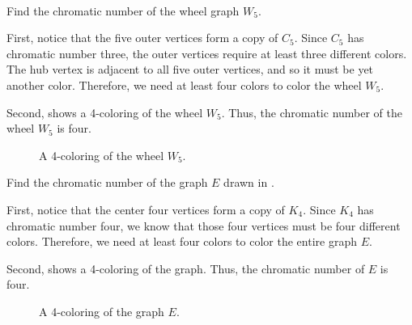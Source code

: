 \begin{exam}
\label{exam_chromatic_complicated}
~
    \begin{apart}
                
        \item Find the chromatic number of the wheel graph $W_5$. 
            \begin{soln}
                First, notice that the five outer vertices form a copy of $C_5$.  Since $C_5$ has chromatic number three, the outer vertices require at least three different colors. The hub vertex is adjacent to all five outer vertices, and so it must be yet another color.  Therefore, we need at least four colors to color the wheel $W_5$. 
                    
                Second,  shows a 4-coloring of the wheel $W_5$. Thus, the chromatic number of the wheel $W_5$ is four.
            \end{soln}

                \begin{figure}[hbtp]
                    \centering
                    
                    \caption{A 4-coloring of the wheel $W_5$.}
                    \label{fig_wheel5_4colored}
                \end{figure}
        \item Find the chromatic number of the graph $E$ drawn in . 
            \begin{soln}
                First, notice that the center four vertices form a copy of $K_4$.  Since $K_4$ has chromatic number four, we know that those four vertices must be four different colors.  Therefore, we need at least four colors to color the entire graph $E$. 
                    
                Second,  shows a 4-coloring of the graph. Thus, the chromatic number of $E$ is four.
            \end{soln}

                \begin{figure}[hbtp]
                    \centering
                    
                    \caption{A 4-coloring of the graph $E$.}
                    \label{fig_elephant_4colored}
                \end{figure}

    \end{apart}
\end{exam}


